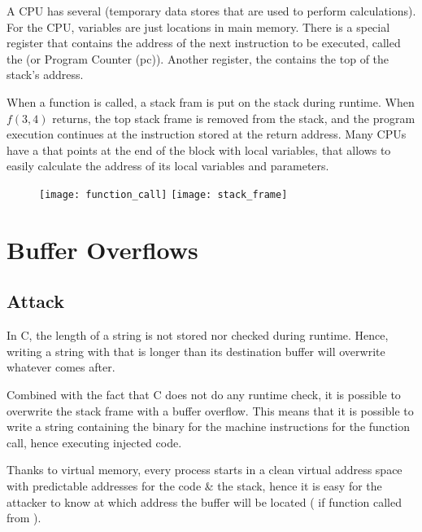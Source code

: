 A CPU has several  (temporary data stores that are used to perform calculations). For the CPU, variables are just locations in main memory. There is a special register that contains the address of the next instruction to be executed, called the  (or Program Counter (pc)). Another register, the  contains the top of the stack's address.

When a function is called, a stack fram is put on the stack during runtime. When $f(3, 4)$ returns, the top stack frame is removed from the stack, and the program execution continues at the instruction stored at the return address. Many CPUs have a  that points at the end of the block with local variables, that allows to easily calculate the address of its local variables and parameters.

\begin{figure}[H]
    \centering
    \texttt{[image: function\_call]}\hfill
	\texttt{[image: stack\_frame]}
\end{figure}

\endgroup

\chapter{Buffer Overflows}

\section{Attack}

In C, the length of a string is not stored nor checked during runtime. Hence, writing a string with  that is longer than its destination buffer will overwrite whatever comes after. 

Combined with the fact that C does not do any runtime check, it is possible to overwrite the stack frame with a buffer overflow. This means that it is possible to write a string containing the binary for the machine instructions for the function call, hence executing injected code.

Thanks to virtual memory, every process starts in a clean virtual address space with predictable addresses for the code \& the stack, hence it is easy for the attacker to know at which address the buffer will be located ( if function  called from ).


